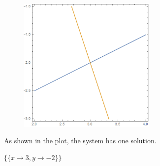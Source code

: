 \documentclass[11pt,a4paper]{article}
\begin{document}
\begin{figure}[!htbp]
\includegraphics[width=0.60\textwidth]{img/ii_8.png}
\end{figure}
As shown in the plot, the system has one solution.\\
\begin{doublespace}
\noindent\(\{\{x\to 3,y\to -2\}\}\)
\end{doublespace}

\clearpage
\end{document}
